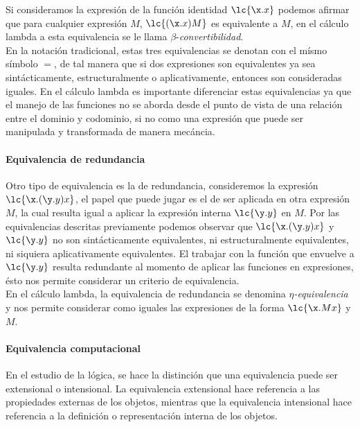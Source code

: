 Si consideramos la expresión de la función identidad \(\lc{\x.x}\) podemos
afirmar que para cualquier expresión \(M\), \(\lc{(\x.x) M}\) es equivalente a
\(M\), en el cálculo lambda a esta equivalencia se le llama
\(\beta\)-\emph{convertibilidad}.\\

En la notación tradicional, estas tres equivalencias se denotan con el mísmo
símbolo \(=\), de tal manera que si dos expresiones son equivalentes ya sea
sintácticamente, estructuralmente o aplicativamente, entonces son consideradas
iguales. En el cálculo lambda es importante diferenciar estas equivalencias ya
que el manejo de las funciones no se aborda desde el punto de vista de una
relación entre el dominio y codominio, si no como una expresión que puede ser
manipulada y transformada de manera mecáncia.\\

\paragraph{Equivalencia de redundancia}

Otro tipo de equivalencia es la de redundancia, consideremos la expresión
\(\lc{\x.(\y.y) x}\), el papel que puede jugar es el de ser aplicada en otra
expresión \(M\), la cual resulta igual a aplicar la expresión interna
\(\lc{\y.y}\) en \(M\). Por las equivalencias descritas previamente podemos
observar que \(\lc{\x.(\y.y) x}\) y \(\lc{\y.y}\) no son sintácticamente
equivalentes, ni estructuralmente equivalentes, ni siquiera aplicativamente
equivalentes. El trabajar con la función que envuelve a \(\lc{\y.y}\) resulta
redundante al momento de aplicar las funciones en expresiones, ésto nos permite
considerar un criterio de equivalencia.\\

En el cálculo lambda, la equivalencia de redundancia se denomina
\(\eta\)\emph{-equivalencia} y nos permite considerar como iguales las
expresiones de la forma \(\lc{\x.M x}\) y \(M\).\\

\paragraph{Equivalencia computacional}

En el estudio de la lógica, se hace la distinción que una equivalencia puede ser
extensional o intensional. La equivalencia extensional hace referencia a las
propiedades externas de los objetos, mientras que la equivalencia intensional
hace referencia a la definición o representación interna de los objetos.\\

